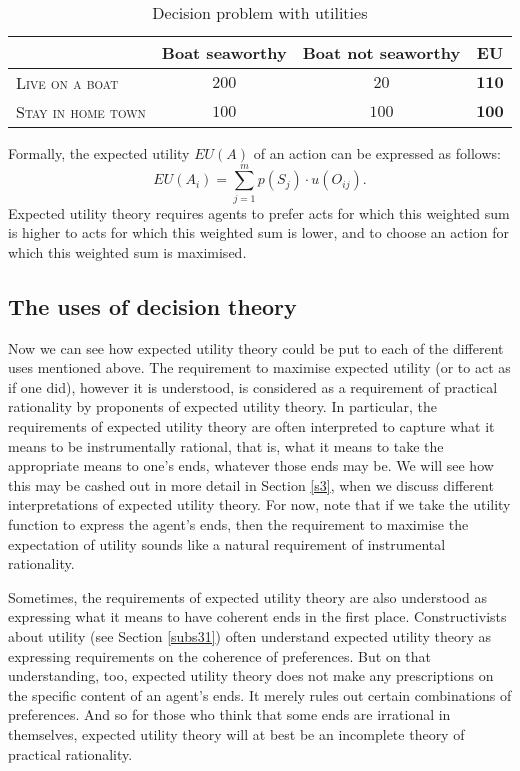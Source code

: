 \begin{table}[h]
\centering
\begin{tabular}{llll}
\hline
\multicolumn{1}{l}{} & 
  \multicolumn{1}{c}{Boat seaworthy} & 
  \multicolumn{1}{c}{Boat not seaworthy} & 
  \multicolumn{1}{c}{\textbf{EU}} \\\hline\hline
\multicolumn{1}{l}{\textsc{Live on a boat}} &
  \multicolumn{1}{c}{$200$} &
  \multicolumn{1}{c}{$20$} & 
  \multicolumn{1}{c}{$\boldsymbol{110}$}\\
\multicolumn{1}{l}{\textsc{Stay in home town}} &
  \multicolumn{1}{c}{$100$} &
  \multicolumn{1}{c}{$100$} &
  \multicolumn{1}{c}{$\boldsymbol{100}$}\\
\hline
\end{tabular}
\caption{Decision problem with utilities}
\label{t3}
\end{table}

Formally, the expected utility $EU(A)$ of an action can be expressed as follows:
$$EU(A_{i}) = \sum\limits_{j=1}^m p (S_j) \cdot u (O_{ij}).$$
Expected utility theory requires agents to prefer acts for which this weighted sum is higher to acts for which this weighted sum is lower, and to choose an action for which this weighted sum is maximised.

\subsection{The uses of decision theory}\label{subs13}

Now we can see how expected utility theory could be put to each of the different uses mentioned above. The requirement to maximise expected utility (or to act as if one did), however it is understood, is considered as a requirement of practical rationality by proponents of expected utility theory. In particular, the requirements of expected utility theory are often interpreted to capture what it means to be instrumentally rational, that is, what it means to take the appropriate means to one's ends, whatever those ends may be. We will see how this may be cashed out in more detail in Section \ref{s3}, when we discuss different interpretations of expected utility theory. For now, note that if we take the utility function to express the agent's ends, then the requirement to maximise the expectation of utility sounds like a natural requirement of instrumental rationality.

Sometimes, the requirements of expected utility theory are also understood as expressing what it means to have coherent ends in the first place. Constructivists about utility (see Section \ref{subs31}) often understand expected utility theory as expressing requirements on the coherence of preferences. But on that understanding, too, expected utility theory does not make any prescriptions on the specific content of an agent's ends. It merely rules out certain combinations of preferences. And so for those who think that some ends are irrational in themselves, expected utility theory will at best be an incomplete theory of practical rationality.

